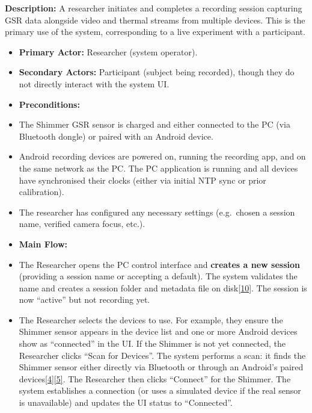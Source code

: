 \documentclass[12pt,a4paper]{article}
\begin{document}
\textbf{Description:} A researcher initiates and completes a recording session capturing GSR data alongside video and thermal streams from multiple devices. This is the primary use of the system, corresponding to a live experiment with a participant.

\begin{itemize}
\item
  \textbf{Primary Actor:} Researcher (system operator).
\item
  \textbf{Secondary Actors:} Participant (subject being recorded), though they do not directly interact with the system UI.
\item
  \textbf{Preconditions:}
\item
  The Shimmer GSR sensor is charged and either connected to the PC (via Bluetooth dongle) or paired with an Android device.
\item
  Android recording devices are powered on, running the recording app, and on the same network as the PC. The PC application is running and all devices have synchronised their clocks (either via initial NTP sync or prior calibration).
\item
  The researcher has configured any necessary settings (e.g.~chosen a session name, verified camera focus, etc.).
\item
  \textbf{Main Flow:}
\item
  The Researcher opens the PC control interface and \textbf{creates a new session} (providing a session name or accepting a default). The system validates the name and creates a session folder and metadata file on disk\href{https://github.com/buccancs/bucika_gsr/blob/7048f7f6a7536f5cd577ed2184800d3dad97fd08/PythonApp/session/session_manager.py\#L64-L73}{{[}10{]}}. The session is now ``active'' but not recording yet.
\item
  The Researcher selects the devices to use. For example, they ensure the Shimmer sensor appears in the device list and one or more Android devices show as ``connected'' in the UI. If the Shimmer is not yet connected, the Researcher clicks ``Scan for Devices''. The system performs a scan: it finds the Shimmer sensor either directly via Bluetooth or through an Android's paired devices\href{https://github.com/buccancs/bucika_gsr/blob/7048f7f6a7536f5cd577ed2184800d3dad97fd08/PythonApp/shimmer_manager.py\#L244-L253}{{[}4{]}}\href{https://github.com/buccancs/bucika_gsr/blob/7048f7f6a7536f5cd577ed2184800d3dad97fd08/PythonApp/shimmer_manager.py\#L260-L268}{{[}5{]}}. The Researcher then clicks ``Connect'' for the Shimmer. The system establishes a connection (or uses a simulated device if the real sensor is unavailable) and updates the UI status to ``Connected''.

\end{itemize}
\end{document}
